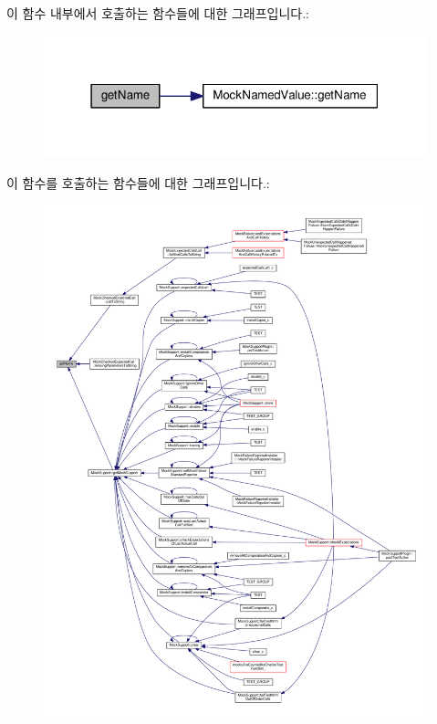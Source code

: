 이 함수 내부에서 호출하는 함수들에 대한 그래프입니다.\+:
\nopagebreak
\begin{figure}[H]
\begin{center}
\leavevmode
\includegraphics[width=315pt]{class_mock_named_value_list_node_ab9fb89f09ab681191e4eaa9221b42491_cgraph}
\end{center}
\end{figure}




이 함수를 호출하는 함수들에 대한 그래프입니다.\+:
\nopagebreak
\begin{figure}[H]
\begin{center}
\leavevmode
\includegraphics[width=350pt]{class_mock_named_value_list_node_ab9fb89f09ab681191e4eaa9221b42491_icgraph}
\end{center}
\end{figure}


